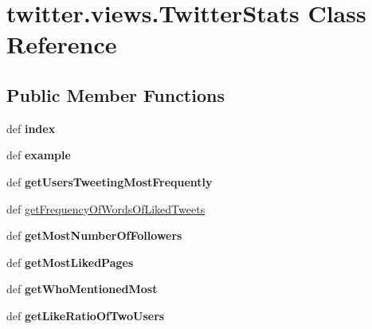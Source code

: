 \hypertarget{classtwitter_1_1views_1_1TwitterStats}{\section{twitter.\-views.\-Twitter\-Stats Class Reference}
\label{classtwitter_1_1views_1_1TwitterStats}
}
\subsection*{Public Member Functions}
\begin{DoxyCompactItemize}
\item 
\hypertarget{classtwitter_1_1views_1_1TwitterStats_a4ed5b049b9cc36bd7bc561399586530a}{def {\bfseries index}}\label{classtwitter_1_1views_1_1TwitterStats_a4ed5b049b9cc36bd7bc561399586530a}

\item 
\hypertarget{classtwitter_1_1views_1_1TwitterStats_a04c9399fea71d988f011da7cbbc52f2e}{def {\bfseries example}}\label{classtwitter_1_1views_1_1TwitterStats_a04c9399fea71d988f011da7cbbc52f2e}

\item 
\hypertarget{classtwitter_1_1views_1_1TwitterStats_ac25d6a140308ebb4e3ac36fe77dfb05b}{def {\bfseries get\-Users\-Tweeting\-Most\-Frequently}}\label{classtwitter_1_1views_1_1TwitterStats_ac25d6a140308ebb4e3ac36fe77dfb05b}

\item 
def \hyperlink{classtwitter_1_1views_1_1TwitterStats_a6ca5eaaaea6d0cc6f3ba6adf1e43a77a}{get\-Frequency\-Of\-Words\-Of\-Liked\-Tweets}
\item 
\hypertarget{classtwitter_1_1views_1_1TwitterStats_ac3d5509bd20a5236580825fe9d729288}{def {\bfseries get\-Most\-Number\-Of\-Followers}}\label{classtwitter_1_1views_1_1TwitterStats_ac3d5509bd20a5236580825fe9d729288}

\item 
\hypertarget{classtwitter_1_1views_1_1TwitterStats_a2bd86bb15f6a672135501f511d87a7f4}{def {\bfseries get\-Most\-Liked\-Pages}}\label{classtwitter_1_1views_1_1TwitterStats_a2bd86bb15f6a672135501f511d87a7f4}

\item 
\hypertarget{classtwitter_1_1views_1_1TwitterStats_a653aa5d8b561876322389e18566cfea1}{def {\bfseries get\-Who\-Mentioned\-Most}}\label{classtwitter_1_1views_1_1TwitterStats_a653aa5d8b561876322389e18566cfea1}

\item 
\hypertarget{classtwitter_1_1views_1_1TwitterStats_a2f62ab9591fe2de8580d32cd5e644c1a}{def {\bfseries get\-Like\-Ratio\-Of\-Two\-Users}}\label{classtwitter_1_1views_1_1TwitterStats_a2f62ab9591fe2de8580d32cd5e644c1a}


\end{DoxyCompactItemize}
